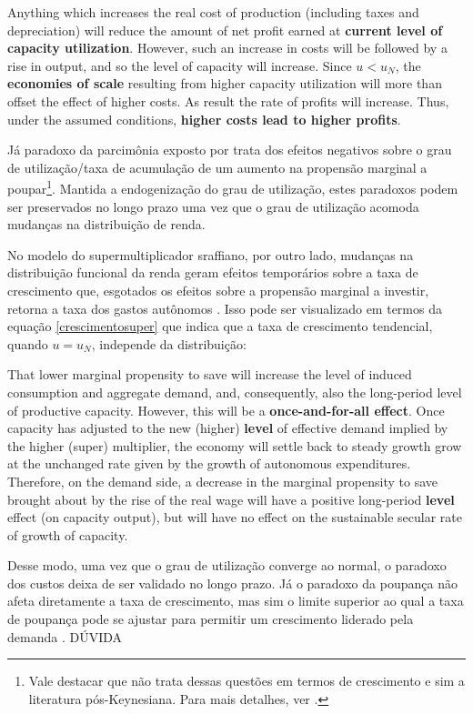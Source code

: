 \begin{citacao}
Anything which increases the real cost of production (including taxes and depreciation) will reduce the amount of net profit earned at \textbf{current level of capacity utilization}. However, such an increase in costs will be followed by a rise in output, and so the level of capacity will increase. Since $u < u_N$, the \textbf{economies of scale} resulting from higher capacity utilization will more than offset the effect of higher costs. As result the rate of profits will increase. Thus, under the assumed conditions, \textbf{higher costs lead to higher profits}.
\cite[p.~18, grifos adicionados e variáveis adaptadas]{rowthorn_demand_1981}
\end{citacao}
Já paradoxo da parcimônia exposto por \textcite{keynes_general_1936} trata dos efeitos negativos sobre o grau de utilização/taxa de acumulação de um aumento na propensão marginal a poupar\footnote{Vale destacar que \textcite{keynes_general_1936} não trata dessas questões em termos de crescimento e sim a literatura pós-Keynesiana. Para mais detalhes, ver \textcite[Cap. 6]{lavoie_post-keynesian_2015}.}. Mantida a endogenização do grau de utilização, estes paradoxos podem ser preservados no longo prazo uma vez que o grau de utilização acomoda mudanças na distribuição de renda.


No modelo do supermultiplicador sraffiano, por outro lado, mudanças na distribuição funcional da renda geram efeitos temporários sobre a taxa de crescimento que, esgotados os efeitos sobre a propensão marginal a investir, retorna a taxa dos gastos autônomos \cite[p.~ 79 VER PÁGINA]{serrano_sraffian_2017}. Isso pode ser visualizado em termos da equação \ref{crescimentosuper} que indica que a taxa de crescimento tendencial, quando $u = u_N$, independe da distribuição:
\begin{citacao}
That lower marginal propensity to save will increase the level of induced consumption and
aggregate demand, and, consequently, also the long-period level of productive capacity.
However, this will be a \textbf{once-and-for-all effect}. Once capacity has adjusted to the new (higher)
\textbf{level} of effective demand implied by the higher (super) multiplier, the economy will settle back
to steady growth grow at the unchanged rate given by the growth of autonomous expenditures.
Therefore, on the demand side, a decrease in the marginal propensity to save brought about by
the rise of the real wage will have a positive long-period \textbf{level} effect (on capacity output), but
will have no effect on the sustainable secular rate of growth of capacity.
\cite[p.~138, grifos adicionados]{serrano_sraffian_1995}
\end{citacao}
Desse modo, uma vez que o grau de utilização converge ao normal, o paradoxo dos custos deixa de ser validado no longo prazo. Já o paradoxo da poupança não afeta diretamente a taxa de crescimento, mas sim o limite superior ao qual a taxa de poupança pode se ajustar para permitir um crescimento liderado pela demanda \cite{serrano_trouble_2017}. DÚVIDA


